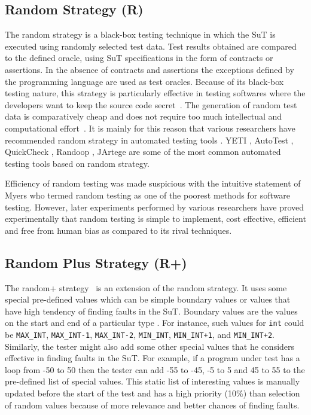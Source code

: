 \documentclass[conference]{IEEEtran}
\begin{document}
\subsection{Random Strategy (R)}
The random strategy is a black-box testing technique in which the SuT is executed using randomly selected test data. Test results obtained are compared to the defined oracle, using SuT specifications in the form of contracts or assertions. In the absence of contracts and assertions the exceptions defined by the programming language are used as test oracles. Because of its black-box testing nature, this strategy is particularly effective in testing softwares where the developers want to keep the source code secret~\cite{Chen2010}. The generation of random test data is comparatively cheap and does not require too much intellectual and computational effort~\cite{Ciupa2009, Ciupa2008}. It is mainly for this reason that various researchers have recommended random strategy in automated testing tools \cite{Ciupa2008}. YETI \cite{Oriol2010a}, AutoTest \cite{Leitner2007, Ciupa2007}, QuickCheck \cite{Claessen2000}, Randoop \cite{Pacheco2007}, JArtege \cite{Oriat2004} are some of the most common automated testing tools based on random strategy.

\indent Efficiency of random testing was made suspicious with the intuitive statement of Myers \cite{Myers2004} who termed random testing as one of the poorest methods for software testing. However, later experiments performed by various researchers \cite{Ciupa2007, Duran1981, Duran1984, Hamlet1994, Ntafos2001} have proved experimentally that random testing is simple to implement, cost effective, efficient and free from human bias as compared to its rival techniques.


\subsection{Random Plus Strategy (R+)}
The random+ strategy~\cite{Leitner2007} is an extension of the random strategy. It uses some special pre-defined values which can be simple boundary values or values that have high tendency of finding faults in the SuT. Boundary values are the values on the start and end of a particular type \cite{Beizer1990}. For instance, such values for \verb+int+ could be \verb+MAX_INT+, \verb+MAX_INT-1+, \verb+MAX_INT-2+, \verb+MIN_INT+, \verb-MIN_INT+1-, and \verb-MIN_INT+2-. Similarly, the tester might also add some other special values that he considers effective in finding faults in the SuT. For example, if a program under test has a loop from -50 to 50 then the tester can add -55 to -45, -5 to 5 and 45 to 55 to the pre-defined list of special values. This static list of interesting values is manually updated before the start of the test and has a high priority (10\%) than selection of random values because of more relevance and better chances of finding faults.
\end{document}
